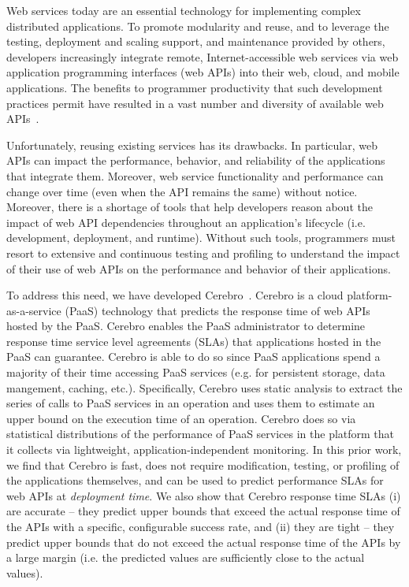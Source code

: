 Web services today are an essential technology for implementing
complex distributed applications.  To promote modularity and reuse, 
and to leverage the testing, deployment and scaling support, and maintenance 
provided by others, developers increasingly integrate remote, Internet-accessible web services 
via web application programming interfaces (web APIs)
into their web, cloud, and mobile applications.  
The benefits to programmer productivity that such development practices
permit have resulted in a vast number and diversity of available web APIs~\cite{pweb}.

Unfortunately, reusing existing services has its drawbacks. In particular, 
web APIs can impact the performance, behavior, and reliability of the applications
that integrate them.  Moreover, web service functionality and performance can change over time 
(even when the API remains the same) without notice.
Moreover, there is a shortage of tools that help developers 
reason about the impact of web API dependencies throughout an application's 
lifecycle (i.e. development, deployment, and runtime).  Without such tools, 
programmers must resort to extensive and continuous testing and profiling 
to understand the impact of their use of web APIs on the performance and behavior
of their applications.

To address this need, we have developed Cerebro~\cite{cerebro-soccsub15}.
Cerebro is a cloud platform-as-a-service (PaaS) technology that
predicts the response time of web APIs hosted by the PaaS.
Cerebro enables the PaaS administrator to determine response time service level 
agreements (SLAs) that applications hosted in the PaaS can guarantee.  Cerebro is able to 
do so since PaaS applications spend a majority of their time accessing PaaS services
(e.g. for persistent storage, data mangement, caching, etc.). Specifically, 
Cerebro uses static analysis to extract the series of calls to PaaS services
in an operation and uses them to estimate an upper bound on the execution time of 
an operation.  Cerebro does so via statistical distributions of the performance of PaaS services
in the platform that it collects via lightweight, application-independent monitoring.
In this prior work, we find that Cerebro is fast, does not require modification,
testing, or profiling of the applications themselves, and can be used to predict 
performance SLAs for web APIs at \textit{deployment time}.
We also show that Cerebro response time SLAs 
(i) are accurate -- they predict upper bounds that exceed the actual response time of the APIs
with a specific, configurable success rate, and (ii)
they are tight -- they predict upper bounds that do not exceed the actual 
response time of the APIs by a large 
margin (i.e. the predicted values are sufficiently close to the actual values). 

